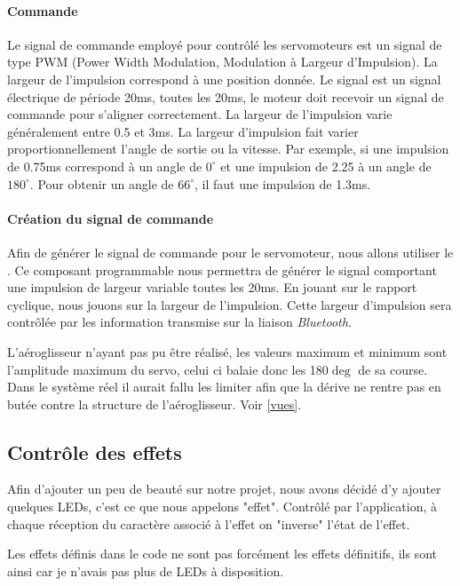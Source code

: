 				\paragraph{Commande}Le signal de commande employé pour contrôlé les servomoteurs est un signal de type PWM (Power Width Modulation, Modulation à Largeur d'Impulsion). La largeur de l'impulsion correspond à une position donnée. Le signal est un signal électrique de période 20ms, toutes les 20ms, le moteur doit recevoir un signal de commande pour s'aligner correctement. La largeur de l'impulsion varie généralement entre 0.5 et 3ms. La largeur d'impulsion fait varier proportionnellement l'angle de sortie ou la vitesse. Par exemple, si une impulsion de 0.75ms correspond à un angle de $0^{\circ}$ et une impulsion de 2.25 à un angle de $180^{\circ}$. Pour obtenir un angle de $66^{\circ}$, il faut une impulsion de 1.3ms.  
			
				\paragraph{Création du signal de commande} Afin de générer le signal de commande pour le servomoteur, nous allons utiliser le \pic. Ce composant programmable nous permettra de générer le signal comportant une impulsion de largeur variable toutes les 20ms. En jouant sur le rapport cyclique, nous jouons sur la largeur de l'impulsion. Cette largeur d'impulsion sera contrôlée par les information transmise sur la liaison \textit{Bluetooth}. 
				
				\begin{tcolorbox}[center,width=0.9\textwidth, colframe=red!90!orange, colback=orange!25, arc=3mm,boxrule=1mm, sharp corners=east,title=Note]
			L'aéroglisseur n'ayant pas pu être réalisé, les valeurs maximum et minimum sont l'amplitude maximum du servo, celui ci balaie donc les 180$\deg$ de sa course. Dans le système réel il aurait fallu les limiter afin que la dérive ne rentre pas en butée contre la structure de l'aéroglisseur. Voir \ref{vues}.
  			\end{tcolorbox}
			
			\subsection{Contrôle des effets}
			Afin d'ajouter un peu de beauté sur notre projet, nous avons décidé d'y ajouter quelques LEDs, c'est ce que nous appelons "effet". Contrôlé par l'application, à chaque réception du caractère associé à l'effet on "inverse" l'état de l'effet.
			\begin{tcolorbox}[center,width=0.9\textwidth, colframe=red!90!orange, colback=orange!25, arc=3mm,boxrule=1mm, sharp corners=east,title=Note]
			Les effets définis dans le code ne sont pas forcément les effets définitifs, ils sont ainsi car je n'avais pas plus de LEDs à disposition.
  			\end{tcolorbox}
			

